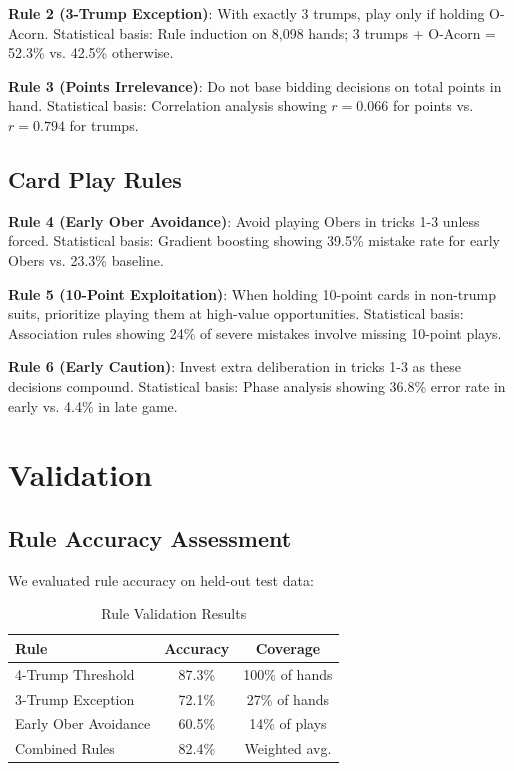 \documentclass[conference]{IEEEtran}
\begin{document}
\textbf{Rule 2 (3-Trump Exception)}: With exactly 3 trumps, play only if holding O-Acorn. Statistical basis: Rule induction on 8,098 hands; 3 trumps + O-Acorn = 52.3\% vs. 42.5\% otherwise.

\textbf{Rule 3 (Points Irrelevance)}: Do not base bidding decisions on total points in hand. Statistical basis: Correlation analysis showing $r = 0.066$ for points vs. $r = 0.794$ for trumps.

\subsection{Card Play Rules}

\textbf{Rule 4 (Early Ober Avoidance)}: Avoid playing Obers in tricks 1-3 unless forced. Statistical basis: Gradient boosting showing 39.5\% mistake rate for early Obers vs. 23.3\% baseline.

\textbf{Rule 5 (10-Point Exploitation)}: When holding 10-point cards in non-trump suits, prioritize playing them at high-value opportunities. Statistical basis: Association rules showing 24\% of severe mistakes involve missing 10-point plays.

\textbf{Rule 6 (Early Caution)}: Invest extra deliberation in tricks 1-3 as these decisions compound. Statistical basis: Phase analysis showing 36.8\% error rate in early vs. 4.4\% in late game.

\section{Validation}

\subsection{Rule Accuracy Assessment}

We evaluated rule accuracy on held-out test data:

\begin{table}[htbp]
\caption{Rule Validation Results}
\begin{center}
\begin{tabular}{lcc}
\toprule
\textbf{Rule} & \textbf{Accuracy} & \textbf{Coverage} \\
\midrule
4-Trump Threshold & 87.3\% & 100\% of hands \\
3-Trump Exception & 72.1\% & 27\% of hands \\
Early Ober Avoidance & 60.5\% & 14\% of plays \\
Combined Rules & 82.4\% & Weighted avg. \\
\bottomrule
\end{tabular}
\label{tab:validation}
\end{center}
\end{table}
\end{document}
